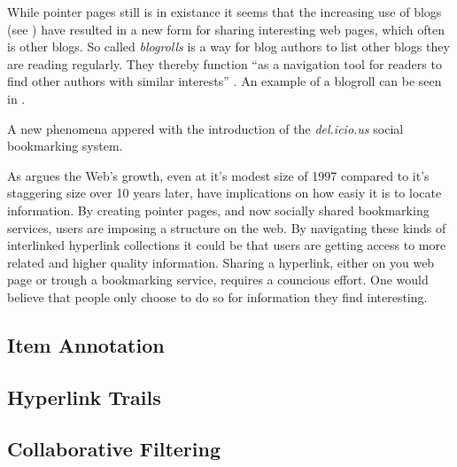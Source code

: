 While pointer pages still is in existance it seems that the increasing
use of blogs (see )
have resulted in a new form for sharing interesting web pages,
which often is other blogs. So called \emph{blogrolls} is a way for blog
authors to list other blogs they are reading regularly. They thereby function
``as a navigation tool for readers to find other authors with similar
interests'' \citep[p.~3]{marlow07}. An example of a blogroll can be seen in
.


A new phenomena appered with the introduction of the \emph{del.icio.us} social
bookmarking system. %

As \citet[p.~806]{dieberger97} argues the Web's growth, even at it's modest
size of 1997 compared to it's staggering size over 10 years later, have
implications on how easiy it is to locate information. By creating pointer
pages, and now socially shared bookmarking services, users are imposing a
structure on the web. By navigating these kinds of interlinked hyperlink
collections it could be that users are getting access to more related and
higher quality information. Sharing a hyperlink, either on you web page or
trough a bookmarking service, requires a councious effort. One would believe
that people only choose to do so for information they find interesting.

\subsection{Item Annotation}

\subsection{Hyperlink Trails}

\subsection{Collaborative Filtering}


